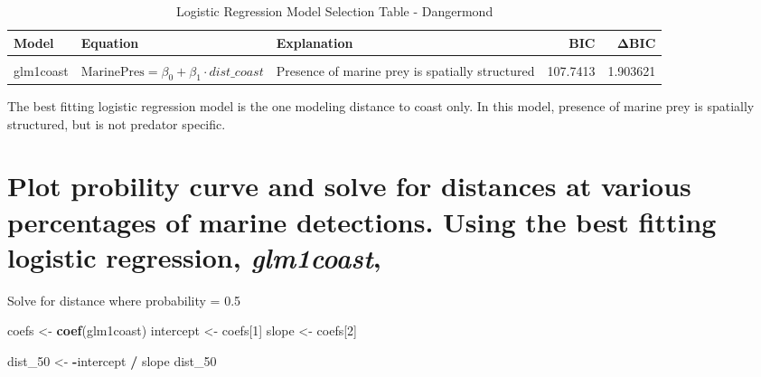 \documentclass[
]{article}
\newenvironment{Shaded}{\begin{snugshade}}{\end{snugshade}}
\newcommand{\DecValTok}[1]{\textcolor[rgb]{0.00,0.00,0.81}{#1}}
\newcommand{\FunctionTok}[1]{\textcolor[rgb]{0.13,0.29,0.53}{\textbf{#1}}}
\newcommand{\NormalTok}[1]{#1}
\newcommand{\OtherTok}[1]{\textcolor[rgb]{0.56,0.35,0.01}{#1}}
\newcommand{\SpecialCharTok}[1]{\textcolor[rgb]{0.81,0.36,0.00}{\textbf{#1}}}
\begin{document}
\begin{table}[H]
\centering
\caption{\label{tab:unnamed-chunk-20}Logistic Regression Model Selection Table - Dangermond}
\centering
\begin{tabular}[t]{l>{\raggedright\arraybackslash}p{3cm}>{\raggedright\arraybackslash}p{3cm}rr}
\toprule
Model & Equation & Explanation & BIC & ΔBIC\\
\midrule
\cellcolor{gray!10}{glm0null} & \cellcolor{gray!10}{\(\mathrm{MarinePres} = \beta_0\)} & \cellcolor{gray!10}{The presence of marine prey is constant across all distances from the coastline} & \cellcolor{gray!10}{105.8377} & \cellcolor{gray!10}{0.000000}\\
glm1coast & \(\mathrm{MarinePres} = \beta_0 + \beta_1 \cdot dist\_coast\) & Presence of marine prey is spatially structured & 107.7413 & 1.903621\\
\bottomrule
\end{tabular}
\end{table}

The best fitting logistic regression model is the one modeling distance
to coast only. In this model, presence of marine prey is spatially
structured, but is not predator specific.

\section{\texorpdfstring{Plot probility curve and solve for distances at
various percentages of marine detections. Using the best fitting
logistic regression,
\emph{glm1coast},}{Plot probility curve and solve for distances at various percentages of marine detections. Using the best fitting logistic regression, glm1coast,}}\label{plot-probility-curve-and-solve-for-distances-at-various-percentages-of-marine-detections.-using-the-best-fitting-logistic-regression-glm1coast}

Solve for distance where probability = 0.5

\begin{Shaded}
\begin{Highlighting}[]
\NormalTok{coefs }\OtherTok{\textless{}{-}} \FunctionTok{coef}\NormalTok{(glm1coast)}
\NormalTok{intercept }\OtherTok{\textless{}{-}}\NormalTok{ coefs[}\DecValTok{1}\NormalTok{]}
\NormalTok{slope }\OtherTok{\textless{}{-}}\NormalTok{ coefs[}\DecValTok{2}\NormalTok{]}

\NormalTok{dist\_50 }\OtherTok{\textless{}{-}} \SpecialCharTok{{-}}\NormalTok{intercept }\SpecialCharTok{/}\NormalTok{ slope}
\NormalTok{dist\_50}
\end{Highlighting}
\end{Shaded}
\end{document}
